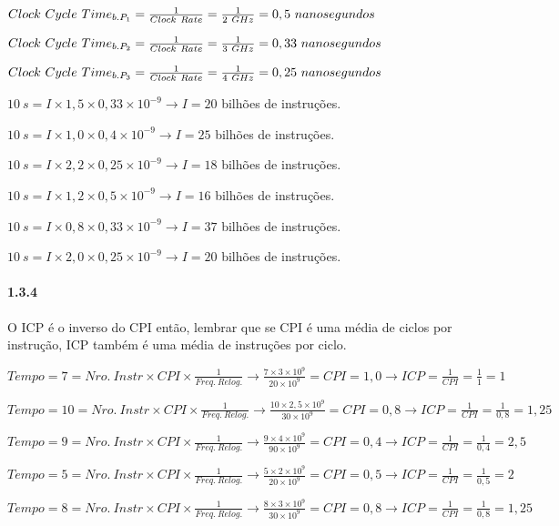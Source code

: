 \documentclass{article}
\begin{document}
$Clock\ Cycle\ Time_{b.P_{1}} = \frac{1}{Clock\ Rate} = \frac{1}{2\ 
\small{GHz}} = 0,5\ nanosegundos$

$Clock\ Cycle\ Time_{b.P_{2}} = \frac{1}{Clock\ Rate} = \frac{1}{3\ 
\small{GHz}} = 0,33\ nanosegundos$

$Clock\ Cycle\ Time_{b.P_{3}} = \frac{1}{Clock\ Rate} = \frac{1}{4\ 
\small{GHz}} = 0,25\ nanosegundos$

$10\ s = I \times 1,5 \times 0,33 \times 10^{-9} \rightarrow I = 20$ bilhões de 
instruções.

$10\ s = I \times 1,0 \times 0,4 \times 10^{-9} \rightarrow I = 25$ bilhões de 
instruções.

$10\ s = I \times 2,2 \times 0,25 \times 10^{-9} \rightarrow I = 18$ bilhões de 
instruções.

$10\ s = I \times 1,2 \times 0,5 \times 10^{-9} \rightarrow I = 16$ bilhões de 
instruções.

$10\ s = I \times 0,8 \times 0,33 \times 10^{-9} \rightarrow I = 37$ bilhões de 
instruções.

$10\ s = I \times 2,0 \times 0,25 \times 10^{-9} \rightarrow I = 20$ bilhões de 
instruções.

\paragraph{1.3.4} O ICP é o inverso do CPI então, lembrar que se CPI é uma 
média de ciclos por instrução, ICP também é uma média de instruções por ciclo.

$Tempo = 7 = {Nro.\ Instr}\times{CPI}\times\frac{1}{Freq.\ Relog.} \rightarrow 
\frac{7 \times 3 \times 10^{9}}{20 \times 10^{9}} = CPI = 1,0 \rightarrow ICP = 
\frac{1}{CPI} = \frac{1}{1} = 1$

$Tempo = 10 = {Nro.\ Instr}\times{CPI}\times\frac{1}{Freq.\ Relog.} \rightarrow 
\frac{10 \times 2,5 \times 10^{9}}{30 \times 10^{9}} = CPI = 0,8 \rightarrow 
ICP = \frac{1}{CPI} = \frac{1}{0,8} = 1,25$

$Tempo = 9 = {Nro.\ Instr}\times{CPI}\times\frac{1}{Freq.\ Relog.} \rightarrow 
\frac{9 \times 4 \times 10^{9}}{90 \times 10^{9}} = CPI = 0,4 \rightarrow ICP = 
\frac{1}{CPI} = \frac{1}{0,4} = 2,5$

$Tempo = 5 = {Nro.\ Instr}\times{CPI}\times\frac{1}{Freq.\ Relog.} \rightarrow 
\frac{5 \times 2 \times 10^{9}}{20 \times 10^{9}} = CPI = 0,5 \rightarrow ICP = 
\frac{1}{CPI} = \frac{1}{0,5} = 2$

$Tempo = 8 = {Nro.\ Instr}\times{CPI}\times\frac{1}{Freq.\ Relog.} \rightarrow 
\frac{8 \times 3 \times 10^{9}}{30 \times 10^{9}} = CPI = 0,8 \rightarrow ICP = 
\frac{1}{CPI} = \frac{1}{0,8} = 1,25$
\end{document}
